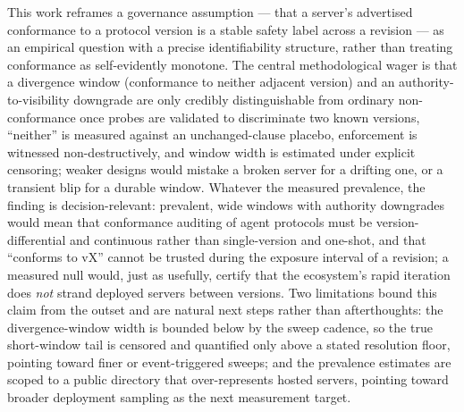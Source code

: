 \documentclass[11pt]{article}
\begin{document}
This work reframes a governance assumption --- that a server's advertised conformance to a protocol version is a stable safety label across a revision --- as an empirical question with a precise identifiability structure, rather than treating conformance as self-evidently monotone. The central methodological wager is that a divergence window (conformance to neither adjacent version) and an authority-to-visibility downgrade are only credibly distinguishable from ordinary non-conformance once probes are validated to discriminate two known versions, ``neither'' is measured against an unchanged-clause placebo, enforcement is witnessed non-destructively, and window width is estimated under explicit censoring; weaker designs would mistake a broken server for a drifting one, or a transient blip for a durable window. Whatever the measured prevalence, the finding is decision-relevant: prevalent, wide windows with authority downgrades would mean that conformance auditing of agent protocols must be version-differential and continuous rather than single-version and one-shot, and that ``conforms to vX'' cannot be trusted during the exposure interval of a revision; a measured null would, just as usefully, certify that the ecosystem's rapid iteration does \emph{not} strand deployed servers between versions. Two limitations bound this claim from the outset and are natural next steps rather than afterthoughts: the divergence-window width is bounded below by the sweep cadence, so the true short-window tail is censored and quantified only above a stated resolution floor, pointing toward finer or event-triggered sweeps; and the prevalence estimates are scoped to a public directory that over-represents hosted servers, pointing toward broader deployment sampling as the next measurement target.



\end{document}

